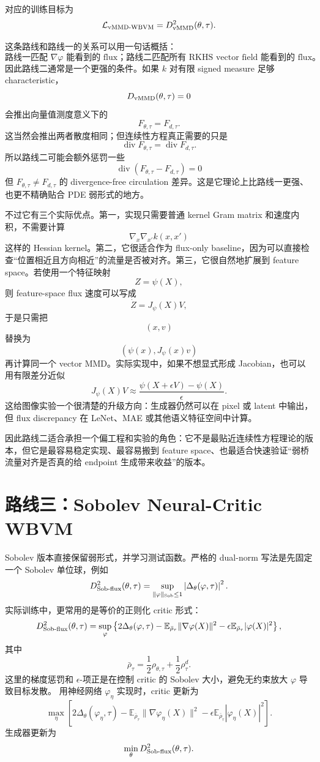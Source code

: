\documentclass[UTF8,11pt]{ctexart}
\newcommand{\E}{\mathbb{E}}
\newcommand{\cL}{\mathcal{L}}
\begin{document}
对应的训练目标为
\[
\cL_{\rm vMMD\text{-}WBVM}
=
D_{\rm vMMD}^2(\theta,\tau).
\]

这条路线和路线一的关系可以用一句话概括：
\[
\boxed{
\text{路线一匹配 } \nabla\varphi \text{ 能看到的 flux；路线二匹配所有 RKHS vector field 能看到的 flux。}
}
\]
因此路线二通常是一个更强的条件。如果 \(k\) 对有限 signed measure 足够 characteristic，
\[
D_{\rm vMMD}(\theta,\tau)=0
\]
会推出向量值测度意义下的
\[
F_{\theta,\tau}=F_{d,\tau}.
\]
这当然会推出两者散度相同；但连续性方程真正需要的只是
\[
\operatorname{div} F_{\theta,\tau}
=
\operatorname{div} F_{d,\tau}.
\]
所以路线二可能会额外惩罚一些
\[
\operatorname{div}(F_{\theta,\tau}-F_{d,\tau})=0
\]
但 \(F_{\theta,\tau}\ne F_{d,\tau}\) 的 divergence-free circulation 差异。这是它理论上比路线一更强、也更不精确贴合 PDE 弱形式的地方。

不过它有三个实际优点。第一，实现只需要普通 kernel Gram matrix 和速度内积，不需要计算
\[
\nabla_x\nabla_{x'}k(x,x')
\]
这样的 Hessian kernel。第二，它很适合作为 flux-only baseline，因为可以直接检查“位置相近且方向相近”的流量是否被对齐。第三，它很自然地扩展到 feature space。若使用一个特征映射
\[
Z=\psi(X),
\]
则 feature-space flux 速度可以写成
\[
\dot Z
=
J_\psi(X)V,
\]
于是只需把
\[
(x,v)
\]
替换为
\[
(\psi(x),J_\psi(x)v)
\]
再计算同一个 vector MMD。实际实现中，如果不想显式形成 Jacobian，也可以用有限差分近似
\[
J_\psi(X)V
\approx
\frac{\psi(X+\epsilon V)-\psi(X)}{\epsilon}.
\]
这给图像实验一个很清楚的升级方向：生成器仍然可以在 pixel 或 latent 中输出，但 flux discrepancy 在 LeNet、MAE 或其他语义特征空间中计算。

因此路线二适合承担一个偏工程和实验的角色：它不是最贴近连续性方程理论的版本，但它是最容易稳定实现、最容易搬到 feature space、也最适合快速验证“弱桥流量对齐是否真的给 endpoint 生成带来收益”的版本。

\section{路线三：Sobolev Neural-Critic WBVM}

Sobolev 版本直接保留弱形式，并学习测试函数。严格的 dual-norm 写法是先固定一个 Sobolev 单位球，例如
\[
D_{\rm Sob\text{-}flux}^2(\theta,\tau)
=
\sup_{\|\varphi\|_{\rm Sob}\le 1}
\left|
\Delta_\theta(\varphi,\tau)
\right|^2.
\]
实际训练中，更常用的是等价的正则化 critic 形式：
\[
D_{\rm Sob\text{-}flux}^2(\theta,\tau)
=
\sup_\varphi
\left\{
2\Delta_\theta(\varphi,\tau)
-
\E_{\bar\rho_\tau}\|\nabla\varphi(X)\|^2
-
\epsilon\E_{\bar\rho_\tau}|\varphi(X)|^2
\right\},
\]
其中
\[
\bar\rho_\tau
=
\frac12\rho_{\theta,\tau}
+
\frac12\rho_\tau^d.
\]
这里的梯度惩罚和 \(\epsilon\)-项正是在控制 critic 的 Sobolev 大小，避免无约束放大 \(\varphi\) 导致目标发散。
用神经网络 \(\varphi_\eta\) 实现时，critic 更新为
\[
\max_\eta
\left[
2\Delta_\theta(\varphi_\eta,\tau)
-
\E_{\bar\rho_\tau}\|\nabla\varphi_\eta(X)\|^2
-
\epsilon\E_{\bar\rho_\tau}|\varphi_\eta(X)|^2
\right].
\]
生成器更新为
\[
\min_\theta
D_{\rm Sob\text{-}flux}^2(\theta,\tau).
\]
\end{document}
